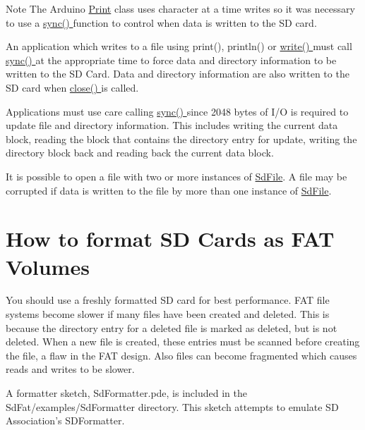 \begin{DoxyNote}{Note}
The Arduino \hyperlink{class_print}{Print} class uses character at a time writes so it was necessary to use a \hyperlink{class_sd_base_file_a3eb7f41182c04388c951db242c13f845}{sync() } function to control when data is written to the S\-D card.
\end{DoxyNote}
\begin{DoxyParagraph}{}
An application which writes to a file using print(), println() or \hyperlink{class_sd_file_ac82b138293686567ab5dfbe3ba1fa1ee}{write() } must call \hyperlink{class_sd_base_file_a3eb7f41182c04388c951db242c13f845}{sync() } at the appropriate time to force data and directory information to be written to the S\-D Card. Data and directory information are also written to the S\-D card when \hyperlink{class_sd_base_file_a46143fd6de3be9ab9951f140d3ae8c2f}{close() } is called.
\end{DoxyParagraph}
\begin{DoxyParagraph}{}
Applications must use care calling \hyperlink{class_sd_base_file_a3eb7f41182c04388c951db242c13f845}{sync() } since 2048 bytes of I/\-O is required to update file and directory information. This includes writing the current data block, reading the block that contains the directory entry for update, writing the directory block back and reading back the current data block.
\end{DoxyParagraph}
It is possible to open a file with two or more instances of \hyperlink{class_sd_file}{Sd\-File}. A file may be corrupted if data is written to the file by more than one instance of \hyperlink{class_sd_file}{Sd\-File}.\hypertarget{index_HowTo}{}\section{How to format S\-D Cards as F\-A\-T Volumes}\label{index_HowTo}
You should use a freshly formatted S\-D card for best performance. F\-A\-T file systems become slower if many files have been created and deleted. This is because the directory entry for a deleted file is marked as deleted, but is not deleted. When a new file is created, these entries must be scanned before creating the file, a flaw in the F\-A\-T design. Also files can become fragmented which causes reads and writes to be slower.

A formatter sketch, Sd\-Formatter.\-pde, is included in the Sd\-Fat/examples/\-Sd\-Formatter directory. This sketch attempts to emulate S\-D Association's S\-D\-Formatter.

